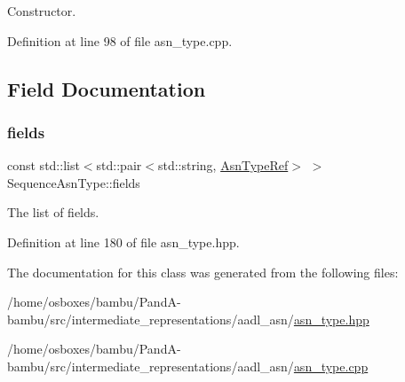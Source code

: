 Constructor. 



Definition at line 98 of file asn\+\_\+type.\+cpp.



\subsection{Field Documentation}
\mbox{\label{classSequenceAsnType_a622d1d34bc965558712d7c75bebe8ddf}} 
\subsubsection{\texorpdfstring{fields}{fields}}
{\footnotesize\ttfamily const std\+::list$<$std\+::pair$<$std\+::string, \hyperlink{asn__type_8hpp_a456d7cf50c15d087cc0428ae80834b35}{Asn\+Type\+Ref}$>$ $>$ Sequence\+Asn\+Type\+::fields}



The list of fields. 



Definition at line 180 of file asn\+\_\+type.\+hpp.



The documentation for this class was generated from the following files\+:\begin{DoxyCompactItemize}
\item 
/home/osboxes/bambu/\+Pand\+A-\/bambu/src/intermediate\+\_\+representations/aadl\+\_\+asn/\hyperlink{asn__type_8hpp}{asn\+\_\+type.\+hpp}\item 
/home/osboxes/bambu/\+Pand\+A-\/bambu/src/intermediate\+\_\+representations/aadl\+\_\+asn/\hyperlink{asn__type_8cpp}{asn\+\_\+type.\+cpp}\end{DoxyCompactItemize}
